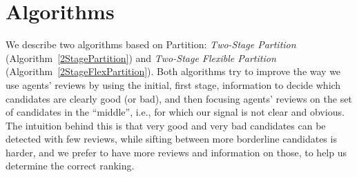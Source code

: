 \documentclass[letterpaper]{article} %
\newcommand{\omer}[1]{\textcolor{red}{\textbf{Omer Says:} #1 }}
\begin{document}

\section{Algorithms}\label{algos}
We describe two algorithms based on Partition: \emph{Two-Stage Partition} (Algorithm~\ref{2StagePartition}) and \emph{Two-Stage Flexible Partition} (Algorithm~\ref{2StageFlexPartition}). Both algorithms try to improve the way we use agents' reviews by using the initial, first stage, information to decide which candidates are clearly good (or bad), and then focusing agents' reviews on the set of candidates in the ``middle'', i.e., for which our signal is not clear and obvious. The intuition behind this is that very good and very bad candidates can be detected with few reviews, while sifting between more borderline candidates is harder, and we prefer to have more reviews and information on those, to help us determine the correct ranking. 
\end{document}
